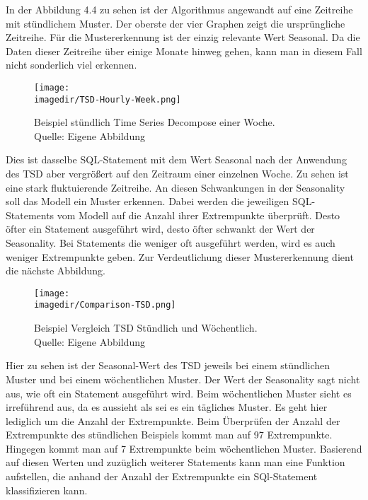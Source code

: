 In der Abbildung 4.4 zu sehen ist der Algorithmus angewandt auf eine Zeitreihe mit stündlichem Muster. Der oberste der vier Graphen zeigt die ursprüngliche Zeitreihe. Für die Mustererkennung ist der einzig relevante Wert Seasonal. Da die Daten dieser Zeitreihe über einige Monate hinweg gehen, kann man in diesem Fall nicht sonderlich viel erkennen.

\begin{figure}[H]
	
	\centering
	\texttt{[image: \\imagedir/TSD-Hourly-Week.png]}
	\captionsetup{format=hang}
	\caption[Beispiel stündlich Time Series Decompose einer Woche]{\label{fig:test}Beispiel stündlich Time Series Decompose einer Woche. \\Quelle: Eigene Abbildung}
	
\end{figure}

Dies ist dasselbe SQL-Statement mit dem Wert Seasonal nach der Anwendung des TSD aber vergrößert auf den Zeitraum einer einzelnen Woche. Zu sehen ist eine stark fluktuierende Zeitreihe. An diesen Schwankungen in der Seasonality soll das Modell ein Muster erkennen. Dabei werden die jeweiligen SQL-Statements vom Modell auf die Anzahl ihrer Extrempunkte überprüft. Desto öfter ein Statement ausgeführt wird, desto öfter schwankt der Wert der Seasonality. Bei Statements die weniger oft ausgeführt werden, wird es auch weniger Extrempunkte geben. Zur Verdeutlichung dieser Mustererkennung dient die nächste Abbildung.

\begin{figure}[H]
	
	\centering
	\texttt{[image: \\imagedir/Comparison-TSD.png]}
	\captionsetup{format=hang}
	\caption[Beispiel Vergleich TSD Stündlich und Wöchentlich]{\label{fig:test}Beispiel Vergleich TSD Stündlich und Wöchentlich. \\Quelle: Eigene Abbildung}
	
\end{figure}

Hier zu sehen ist der Seasonal-Wert des TSD jeweils bei einem stündlichen Muster und bei einem wöchentlichen Muster. Der Wert der Seasonality sagt nicht aus, wie oft ein Statement ausgeführt wird. Beim wöchentlichen Muster sieht es irreführend aus, da es aussieht als sei es ein tägliches Muster. Es geht hier lediglich um die Anzahl der Extrempunkte. Beim Überprüfen der Anzahl der Extrempunkte des stündlichen Beispiels kommt man auf 97 Extrempunkte. Hingegen kommt man auf 7 Extrempunkte  beim wöchentlichen Muster. Basierend auf diesen Werten und zuzüglich weiterer Statements kann man eine Funktion aufstellen, die anhand der Anzahl der Extrempunkte ein SQl-Statement klassifizieren kann.

